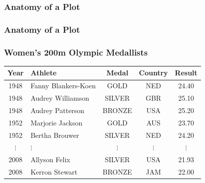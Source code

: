 \documentclass{beamer}
\begin{document}
\begin{frame}
\frametitle{Anatomy of a Plot}

\end{frame}

\begin{frame}
\frametitle{Anatomy of a Plot}

\end{frame}

\begin{frame}[fragile]
\frametitle{Women's 200m Olympic Medallists}
\footnotesize{
\begin{center}
\begin{tabular}{clccc}
\toprule
Year & Athlete & Medal & Country & Result \\
\midrule
1948 & Fanny Blankers-Koen & GOLD & NED & 24.40 \\
1948 & Audrey Williamson & SILVER & GBR & 25.10 \\
1948 & Audrey Patterson & BRONZE & USA & 25.20 \\
1952 & Marjorie Jackson & GOLD & AUS & 23.70 \\
1952 & Bertha Brouwer & SILVER & NED & 24.20 \\
$\vdots$ & $\vdots$ & $\vdots$ & $\vdots$ & $\vdots$ \\
2008 & Allyson Felix & SILVER & USA & 21.93 \\
2008 & Kerron Stewart & BRONZE & JAM & 22.00 \\
\bottomrule
\end{tabular}
\end{center}
}
\end{frame}
\end{document}
